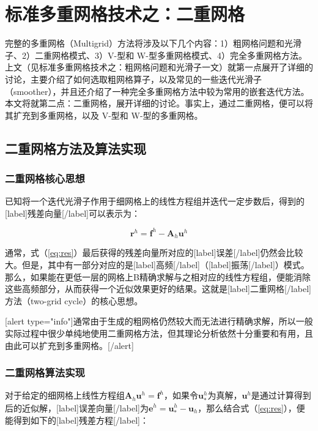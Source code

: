 \documentclass[12pt, UTF8, nofonts]{ctexart}
\begin{document}

\section*{标准多重网格技术之：二重网格}

完整的多重网格（Multigrid）方法将涉及以下几个内容：1）粗网格问题和光滑子、2）二重网格模式、3）V-型和 W-型多重网格模式、4）完全多重网格方法。上文（见标准多重网格技术之：粗网格问题和光滑子一文）就第一点展开了详细的讨论，主要介绍了如何选取粗网格算子，以及常见的一些迭代光滑子（smoother），并且还介绍了一种完全多重网格方法中较为常用的嵌套迭代方法。本文将就第二点：二重网格，展开详细的讨论。事实上，通过二重网格，便可以将其扩充到多重网格，以及 V-型和 W-型的多重网格。

\subsection*{二重网格方法及算法实现}

\subsubsection*{二重网格核心思想}

已知将一个迭代光滑子作用于细网格上的线性方程组并迭代一定步数后，得到的[label]残差向量[/label]可以表示为：

\begin{equation}
  \label{eq:res}
  \boldsymbol{r}^h = \boldsymbol{f}^{h} - \boldsymbol{A}_h\boldsymbol{u}^h
\end{equation}

通常，式（\ref{eq:res}）最后获得的残差向量所对应的[label]误差[/label]仍然会比较大。但是，其中有一部分对应的是[label]高频[/label]（[label]振荡[/label]）模式。那么，如果能在更低一层的网格上B精确求解与之相对应的线性方程组，便能消除这些高频部分，从而获得一个近似效果更好的结果。这就是[label]二重网格[/label]方法（two-grid cycle）的核心思想。

[alert type="info"]通常由于生成的粗网格仍然较大而无法进行精确求解，所以一般实际过程中很少单纯地使用二重网格方法，但其理论分析依然十分重要和有用，且由此可以扩充到多重网格。[/alert]

\subsubsection*{二重网格算法实现}

对于给定的细网格上线性方程组$\boldsymbol{A}_h\boldsymbol{u}^h=\boldsymbol{f}^h$，如果令$\boldsymbol{u}^h_{\ast}$为真解，$\boldsymbol{u}^h$是通过计算得到后的近似解，[label]误差向量[/label]为$\boldsymbol{e}^h = \boldsymbol{u}^h_{\ast}-\boldsymbol{u}_h$，那么结合式（\ref{eq:res}），便能得到如下的[label]残差方程[/label]：
\end{document}
